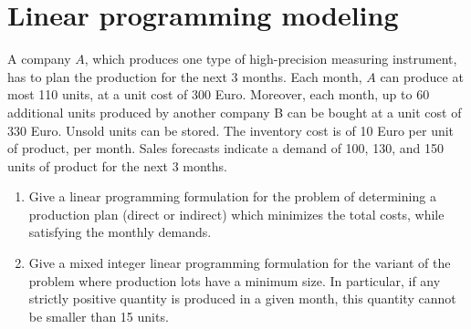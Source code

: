 \documentclass[12pt, a4paper]{report}
\begin{document}
    \newpage 

    \section{Linear programming modeling}
        A company $A$, which produces one type of high-precision measuring instrument, has to plan the production for the next 3 months. Each month, $A$ can produce at most 110 units, 
        at a unit cost of 300 Euro. Moreover, each month, up to 60 additional units produced by another company B can be bought at a unit cost of 330 Euro. Unsold units can be 
        stored. The inventory cost is of 10 Euro per unit of product, per month. Sales forecasts indicate a demand of 100, 130, and 150 units of product for the next 3 months.
        \begin{enumerate}
            \item Give a linear programming formulation for the problem of determining a production plan (direct or indirect) which minimizes the total costs, while satisfying 
                the monthly demands.
            \item Give a mixed integer linear programming formulation for the variant of the problem where production lots have a minimum size. In particular, if any strictly 
                positive quantity is produced in a given month, this quantity cannot be smaller than 15 units. 
        \end{enumerate}
\end{document}
